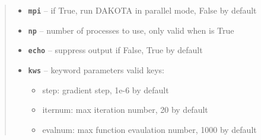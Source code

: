 \documentclass[letterpaper,10pt,english]{sphinxmanual}
\begin{document}
\begin{fulllineitems}
\begin{fulllineitems}
\begin{quote}
\begin{description}
\begin{itemize}
\item {} 
\textbf{\texttt{mpi}} -- if True, run DAKOTA in parallel mode, False by default

\item {} 
\textbf{\texttt{np}} -- number of processes to use, only valid when  is True

\item {} 
\textbf{\texttt{echo}} -- suppress output if False, True by default

\item {} 
\textbf{\texttt{kws}} -- 
keyword parameters
valid keys:
\begin{itemize}
\item {} 
step: gradient step, 1e-6 by default

\item {} 
iternum: max iteration number, 20 by default

\item {} 
evalnum: max function evaulation number, 1000 by default

\end{itemize}


\end{itemize}

\end{description}\end{quote}

\end{fulllineitems}


\begin{fulllineitems}
\label{src/apidocs/genopt:genopt.DakotaOC.vcors}
\end{fulllineitems}


\end{fulllineitems}

\end{document}
